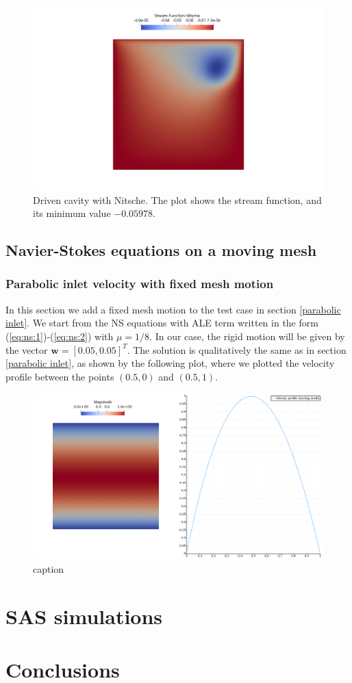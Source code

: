 \documentclass[a4paper,11pt,openright,twoside]{book}
\begin{document}
\begin{figure}[ht]
\centering
\includegraphics[width=\textwidth]{images/stream_function_nitsche.png}
\vspace{-1cm}
\caption{Driven cavity with Nitsche. The plot shows the stream function, and its minimum value $-0.05978$.}
\end{figure}

\newpage

\section{Navier-Stokes equations on a moving mesh}
\subsection{Parabolic inlet velocity with fixed mesh motion}
In this section we add a fixed mesh motion to the test case in section \ref{parabolic inlet}. We start from the NS equations with ALE term written in the form (\ref{eq:ns:1})-(\ref{eq:ns:2}) with $\mu = 1/8$. In our case, the rigid motion will be given by the vector $\mathbf{w} = [0.05, 0.05]^T$. The solution is qualitatively the same as in section \ref{parabolic inlet}, as shown by the following plot, where we plotted the velocity profile between the points $(0.5, 0)$ and $(0.5, 1)$.

\begin{figure}[ht]
\centering
\includegraphics[width=\textwidth]{images/velocity_moving.png}
\caption{caption}
\end{figure}

\chapter{SAS simulations}

\chapter{Conclusions}
\end{document}
